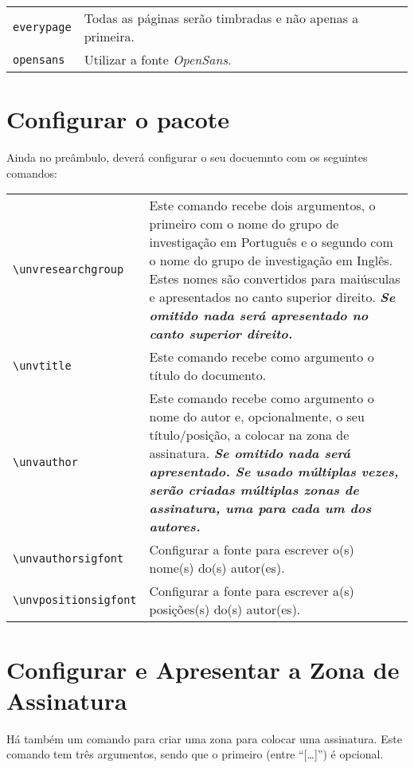 \documentclass[a4paper,11pt]{article}
\newcommand*{\thePackage}{\texttt{\uninovaletterheadname}}
\begin{document}
\bgroup
  \renewcommand{\arraystretch}{1.5}
  \begin{xltabular}{\textwidth}{lX}
    \texttt{everypage}  & Todas as páginas serão timbradas e não apenas a primeira.\\
    \texttt{opensans}   & Utilizar a fonte \emph{OpenSans}.\\
  \end{xltabular}
\egroup

\section{Configurar o pacote \thePackage}

Ainda no preâmbulo, deverá configurar o seu docuemnto com os seguintes comandos:

\bgroup
  \renewcommand{\arraystretch}{1.5}
  \begin{xltabular}{\textwidth}{lX}
    \verb+\unvresearchgroup+    & Este comando recebe dois argumentos, o primeiro com o nome do grupo de investigação em Português e o segundo com o nome do grupo de investigação em Inglês.  Estes nomes são convertidos para maiúsculas e apresentados no canto superior direito.  \textbf{\textsl{Se omitido nada será apresentado no canto superior direito.}}\\
    \verb+\unvtitle+            & Este comando recebe como argumento o título do documento.\\
    \verb+\unvauthor+           & Este comando recebe como argumento o nome do autor e, opcionalmente, o seu título/posição, a colocar na zona de assinatura.  \textbf{\textsl{Se omitido nada será apresentado.  Se usado múltiplas vezes, serão criadas múltiplas zonas de assinatura, uma para cada um dos autores.}}\\
    \verb+\unvauthorsigfont+    &  Configurar a fonte para escrever o(s) nome(s) do(s) autor(es).\\
    \verb+\unvpositionsigfont+  &  Configurar a fonte para escrever a(s) posições(s) do(s) autor(es).\\
  \end{xltabular}
\egroup

\section{Configurar e Apresentar a Zona de Assinatura}

Há também um comando para criar uma zona para colocar uma assinatura.  Este comando tem três argumentos, sendo que o primeiro (entre “[…]”) é opcional.
\end{document}
